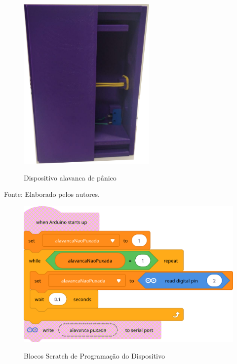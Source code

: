 \documentclass[
  12pt,
  a4paper,
]{article}
\newenvironment{Fonte}
  {\par\begin{center}\begingroup\setstretch{1}\small}
  {\par\endgroup\end{center}}
\begin{document}
\begin{figure}[H]
  \centering
  \caption{Dispositivo alavanca de pânico}
  \includegraphics[width=0.6\textwidth]{images/dispositivo.png}
  \label{fig:dispositivo}
\end{figure}

\begin{Fonte}

Fonte: Elaborado pelos autores.

\end{Fonte}

\begin{figure}[H]
  \centering
  \caption{Blocos Scratch de Programação do Dispositivo}
  \includegraphics[width=1.0\textwidth]{images/dispositivoscratch.png}
  \label{fig:dispositivoscratch}
\end{figure}
\end{document}
